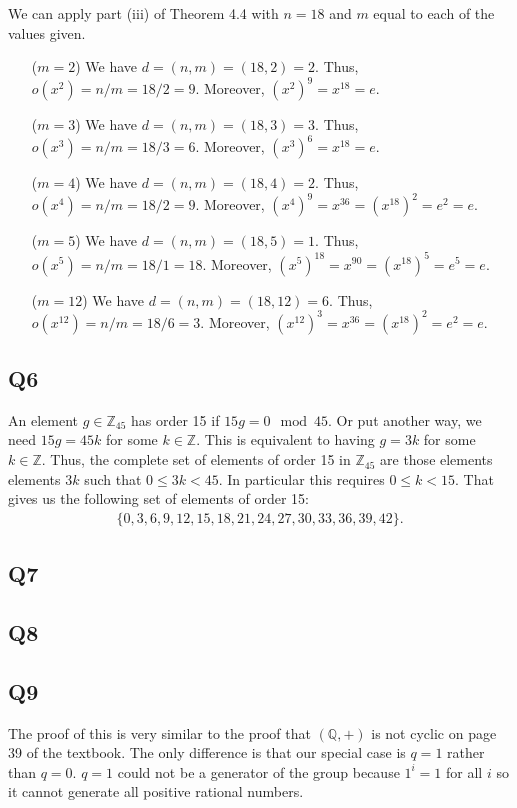 \documentclass[12pt]{article}
\def\Q{{\mathbb Q}}        %
\def\Z{{\mathbb Z}}        %
\numberwithin{theorem}{section}
\numberwithin{equation}{section}
\numberwithin{remark}{section}
\numberwithin{definition}{section}
\numberwithin{theorem}{section}
\numberwithin{lemma}{section}
\numberwithin{example}{section}
\begin{document}
We can apply part (iii) of Theorem 4.4 with $n=18$ and $m$ equal to each of the values given. 
\begin{itemize}
	\item[($m=2$)]{We have $d=(n,m)=(18,2)=2$. Thus, $o(x^2)=n/m=18/2=9$. Moreover, $(x^2)^9=x^{18}=e$.}
	\item[($m=3$)]{We have $d=(n,m)=(18,3)=3$. Thus, $o(x^3)=n/m=18/3=6$. Moreover, $(x^3)^6=x^{18}=e$.}
	\item[($m=4$)]{We have $d=(n,m)=(18,4)=2$. Thus, $o(x^4)=n/m=18/2=9$. Moreover, $(x^4)^9=x^{36}=(x^{18})^2=e^2=e$.}
	\item[($m=5$)]{We have $d=(n,m)=(18,5)=1$. Thus, $o(x^5)=n/m=18/1=18$. Moreover, $(x^5)^{18}=x^{90}=(x^{18})^5=e^5=e$.}
	\item[($m=12$)]{We have $d=(n,m)=(18,12)=6$. Thus, $o(x^{12})=n/m=18/6=3$. Moreover, $(x^{12})^3=x^{36}=(x^{18})^2=e^2=e$.}
\end{itemize}



\subsection{Q6}

An element $g\in\Z_{45}$ has order 15 if $15g=0\mod{45}$. Or put another way, we need $15g=45k$ for some $k\in\Z$. This is equivalent to having $g=3k$ for some $k\in\Z$. Thus, the complete set of elements of order 15 in $\Z_{45}$ are those elements elements $3k$ such that $0\le 3k < 45$. In particular this requires $0\le k < 15$. That gives us the following set of elements of order 15:
\begin{align*}
	\{0,3,6,9,12,15,18,21,24,27,30,33,36,39,42\}.
\end{align*}



\subsection{Q7}

\subsection{Q8}

\subsection{Q9}

The proof of this is very similar to the proof that $(\Q,+)$ is not cyclic on page 39 of the textbook. The only difference is that our special case is $q=1$ rather than $q=0$. $q=1$ could not be a generator of the group because $1^i=1$ for all $i$ so it cannot generate all positive rational numbers. 
\end{document}
